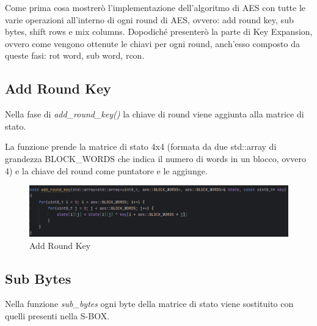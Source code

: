          

\textsf{\small Come prima cosa mostrerò l'implementazione dell'algoritmo di AES con tutte le varie operazioni all'interno di ogni round di AES, ovvero: add round key, sub bytes, shift rows e mix columns. Dopodiché presenterò la parte di Key Expansion, ovvero come vengono ottenute le chiavi per ogni round, anch'esso composto da queste fasi: rot word, sub word, rcon.}


\subsection{Add Round Key}

   

\textsf{\small Nella fase di \emph{add\_round\_key()} la chiave di round viene aggiunta alla matrice di stato.}

\textsf{\small La funzione prende la matrice di stato 4x4 (formata da due std::array di grandezza BLOCK\_WORDS che indica il numero di words in un blocco, ovvero 4) e la chiave del round come puntatore e le aggiunge.}

\begin{figure}[H]
	\centering
	\includegraphics[width=1\textwidth, height=1\textheight, keepaspectratio]{./images/code/cpp/encryption/add_round_key.PNG}
	\caption{Add Round Key}
	\label{fig:add_round_key}
\end{figure}

\subsection{Sub Bytes}

 

\textsf{\small Nella funzione \emph{sub\_bytes} ogni byte della matrice di stato viene sostituito con quelli presenti nella S-BOX.}

